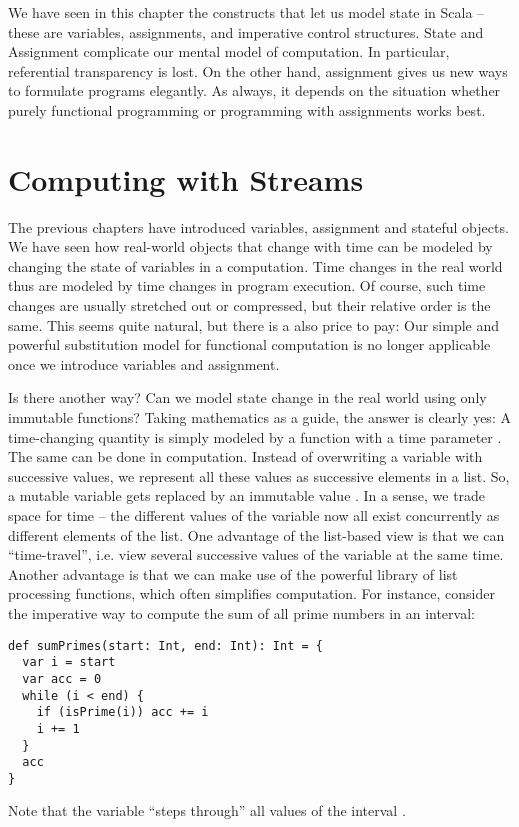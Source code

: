 {We have seen in this chapter the constructs that let us model state in
Scala -- these are variables, assignments, and imperative control
structures.  State and Assignment complicate our mental model of
computation.  In particular, referential transparency is lost.  On the
other hand, assignment gives us new ways to formulate programs
elegantly. As always, it depends on the situation whether purely
functional programming or programming with assignments works best.

\chapter{Computing with Streams}

The previous chapters have introduced variables, assignment and
stateful objects.  We have seen how real-world objects that change
with time can be modeled by changing the state of variables in a
computation.  Time changes in the real world thus are modeled by time
changes in program execution. Of course, such time changes are usually
stretched out or compressed, but their relative order is the same.
This seems quite natural, but there is a also price to pay: Our simple
and powerful substitution model for functional computation is no
longer applicable once we introduce variables and assignment.

Is there another way? Can we model state change in the real world
using only immutable functions? Taking mathematics as a guide, the
answer is clearly yes: A time-changing quantity is simply modeled by
a function  with a time parameter . The same can be
done in computation. Instead of overwriting a variable with successive
values, we represent all these values as successive elements in a
list. So, a mutable variable  gets replaced by an
immutable value . In a sense, we trade space for
time -- the different values of the variable now all exist concurrently
as different elements of the list.  One advantage of the list-based
view is that we can ``time-travel'', i.e. view several successive
values of the variable at the same time. Another advantage is that we
can make use of the powerful library of list processing functions,
which often simplifies computation. For instance, consider the
imperative way to compute the sum of all prime numbers in an interval:
\begin{lstlisting}
def sumPrimes(start: Int, end: Int): Int = {
  var i = start
  var acc = 0
  while (i < end) {
    if (isPrime(i)) acc += i
    i += 1
  }
  acc
}
\end{lstlisting}
Note that the variable  ``steps through'' all values of the interval
.

}
